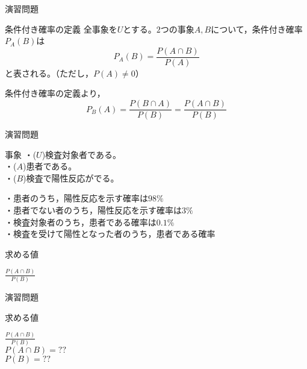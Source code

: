 \documentclass[aspectratio=169, dvipdfmx, 11pt]{beamer}
\begin{document}
\begin{frame}{演習問題}
    \begin{block}{条件付き確率の定義}
	全事象を$U$とする。$2$つの事象$A,B$について，条件付き確率$P_A(B)$は
	\begin{equation}
		P_A(B)=\frac{P(A\cap B)}{P(A)}
	\end{equation}
	と表される。（ただし，$P(A)\ne 0$）
    \end{block}

条件付き確率の定義より，\\
\begin{equation}
P_B(A)=\frac{P(B\cap A)}{P(B)}=\frac{P(A\cap B)}{P(B)}
\end{equation}

\end{frame}


\begin{frame}{演習問題}

\begin{alertblock}{事象}
・($U$)検査対象者である。\\
・($A$)患者である。\\
・($B$)検査で陽性反応がでる。\\
\end{alertblock}

・患者のうち，陽性反応を示す確率は$98\%$\\
・患者でない者のうち，陽性反応を示す確率は$3\%$\\
・検査対象者のうち，患者である確率は$0.1\%$\\
・検査を受けて陽性となった者のうち，患者である確率

\begin{alertblock}{求める値}
\begin{center}
$\frac{P(A\cap B)}{P(B)}$
\end{center}
\end{alertblock}

\end{frame}


\begin{frame}{演習問題}

\begin{alertblock}{求める値}
\begin{center}
$\frac{P(A\cap B)}{P(B)}$\\
$P(A\cap B)=??$\\
$P(B)=??$
\end{center}
\end{alertblock}

\end{frame}
\end{document}
